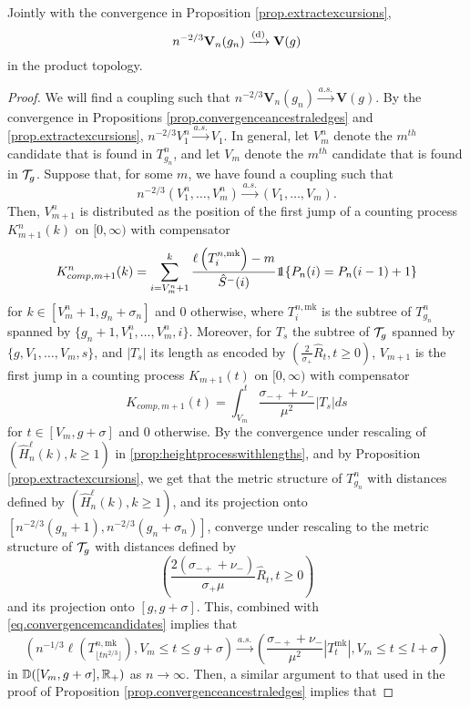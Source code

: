 \begin{proposition}\label{prop.convergencestartingpointscandidates}
Jointly with the convergence in Proposition \ref{prop.extractexcursions}, 
$$n^{-2/3}\mathbf{V}_n(g_n)\xrightarrow[]{\mathrm{(d)}}\mathbf{V}(g)$$
in the product topology.
\end{proposition}
\begin{proof}
We will find a coupling such that $n^{-2/3}\mathbf{V}_n(g_n)\overset{a.s.}{\to}\mathbf{V}(g).$ By the convergence in Propositions \ref{prop.convergenceancestraledges} and \ref{prop.extractexcursions}, $n^{-2/3}V_1^n\overset{a.s.}{\to}V_1$. In general, let $V_m^n$ denote the $m^{th}$ candidate that is found in $T^n_{g_n}$, and let $V_m$ denote the $m^{th}$ candidate that is found in ${\mathcal T}_g$. Suppose that, for some $m$, we have found a coupling such that 
\begin{equation}\label{eq.convergencemcandidates}n^{-2/3}(V_1^n,\dots,V_m^n)\overset{a.s.}{\to}(V_1,\dots,V_m).\end{equation}
Then, $V_{m+1}^n$ is distributed as the position of the first jump of a counting process $K^n_{m+1}(k)$ on $[0,\infty)$ with compensator 
$$K^n_{comp,m+1}(k)=\sum_{i=V_m^n+1}^k \frac{\ell\left(T^{n,\text{mk}}_{i}\right)-m}{\hat{S}^-(i)}  \one{\left\{P_n(i)=P_n(i-1)+1\right\}}$$
for $k\in [V_m^n+1,g_n+\sigma_n]$ and $0$ otherwise, where $T^{n,\text{mk}}_{i}$ is the subtree of $T^n_{g_n}$ spanned by $\{g_n+1,V^n_1,\dots,V^n_m,i\}$. 
Moreover, for $T_s$ the subtree of ${\mathcal T}_g$ spanned by $\{g,V_1,\dots,V_m, s\}$, and $|T_s|$ its length as encoded by $\left(\frac{2}{\sigma_+}\hat{R}_t,t\geq 0\right)$, $V_{m+1}$ is the first jump in a counting process $K_{m+1}(t)$ on $[0,\infty)$ with compensator 
$$K_{comp,m+1}(t)= \int_{V_m}^t\frac{\sigma_{-+}+\nu_-}{\mu^2}|T_s|ds$$
for $t\in [V_m,g+\sigma]$ and $0$ otherwise. By the convergence under rescaling of $(\hat{H}^\ell_n(k),k\geq 1)$ in \cref{prop:heightprocesswithlengths}, and by Proposition \ref{prop.extractexcursions}, we get that the metric structure of $T^n_{g_n}$ with distances defined by $(\hat{H}^\ell_n(k),k\geq 1)$, and its projection onto $[n^{-2/3}(g_n+1),n^{-2/3}(g_n+\sigma_n)]$, converge under rescaling to the metric structure of ${\mathcal T}_g$ with distances defined by $$\left(\frac{2(\sigma_{-+}+\nu_-)}{\sigma_+\mu}\hat{R}_t,t\geq 0\right)$$ and its projection onto $[g,g+\sigma]$. This, combined with \cref{eq.convergencemcandidates} implies that 
$$\left(n^{-1/3}\ell\left(T^{n,\text{mk}}_{\lfloor t n^{2/3}\rfloor}\right),V_m\leq t \leq g+\sigma\right)\overset{a.s.}{\to} \left(\frac{\sigma_{-+}+\nu_-}{\mu^2}|T^{\text{mk}}_t|, V_m\leq t \leq l+\sigma\right)$$ in ${\mathbb D}([V_m,g+\sigma],{\mathbb R}_+)$ as $n\to \infty$. Then, a similar argument to that used in the proof of Proposition \ref{prop.convergenceancestraledges} implies that 

\end{proof}

